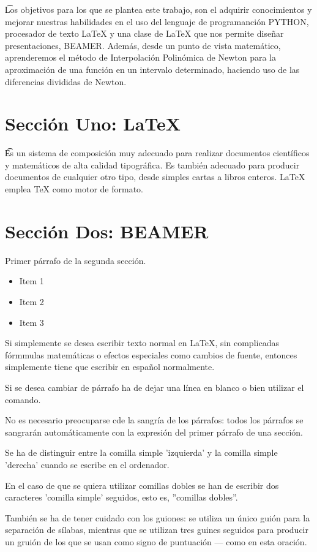 
\t Los objetivos para los que se plantea este trabajo, son el adquirir conocimientos y mejorar nuestras habilidades en el uso del lenguaje de programanción PYTHON, procesador de texto \LaTeX{} y una clase de \LaTeX{} que nos permite diseñar presentaciones, BEAMER. Además, desde un punto de vista matemático, aprenderemos el método de Interpolación Polinómica de Newton para la aproximación de una función en un intervalo determinado, haciendo uso de las diferencias divididas de Newton.
\section{Sección Uno: \LaTeX}
\label{1:sec:1}
 \t Es un sistema de composición muy adecuado para realizar documentos científicos y matemáticos de alta calidad tipográfica. Es también adecuado para producir documentos de cualquier otro tipo, desde simples cartas a libros enteros. \LaTeX{} emplea \TeX{} como motor de formato.

\section{Sección Dos: BEAMER}
\label{1:sec:2}
  Primer párrafo de la segunda sección.

\begin{itemize}
  \item Item 1
  \item Item 2
  \item Item 3
\end{itemize}
 
 Si simplemente se desea escribir texto normal en LaTeX,
 sin complicadas fórmmulas matemáticas o efectos especiales
 como cambios de fuente, entonces simplemente tiene que escribir
 en español normalmente.\par
 Si se desea cambiar de párrafo ha de dejar una línea en blanco o bien 
 utilizar el comando. \par
 No es necesario preocuparse cde la sangría de los párrafos:
 todos los párrafos se sangrarán automáticamente con la expresión
 del primer párrafo de una sección.\par
 Se ha de distinguir entre la comilla simple 'izquierda'
 y la comilla simple 'derecha' cuando se escribe en el ordenador.\par
 En el caso de que se quiera utilizar comillas dobles se han de 
 escribir dos caracteres 'comilla simple' seguidos, esto es,
 ''comillas dobles''.\par
 También se ha de tener cuidado con los guiones: se utiliza un único
 guión para la separación de sílabas, mientras que se utilizan
 tres guines seguidos para producir un gruión de los que se usan
 como signo de puntuación --- como en esta oración.
